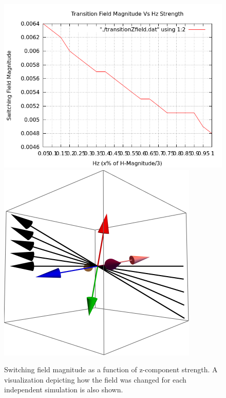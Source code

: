 \documentclass{article}
\begin{document}
\begin{figure}[ht]
\centering
 \includegraphics[scale=0.5]{VariedZdirection/transitionZfield.png}
 \includegraphics[scale=0.7]{VariedZdirection/illustration.png}
 \caption{Switching field magnitude as a function of z-component strength. A visualization depicting how the field
 was changed for each independent simulation is also shown.}
\end{figure}
\clearpage
\end{document}
